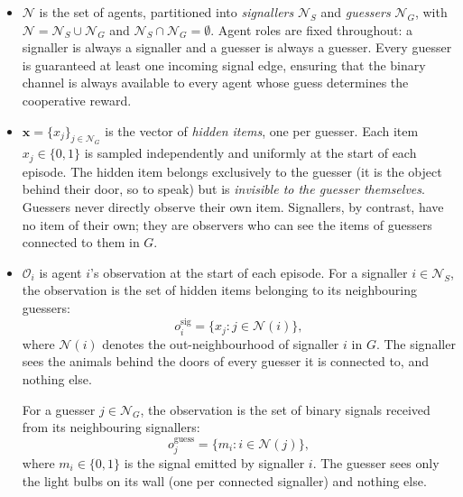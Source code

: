 \documentclass[a4paper,twoside,12pt]{report}
\begin{document}
    \begin{itemize}
        \item $\mathcal{N}$ is the set of agents, partitioned into
        \emph{signallers} $\mathcal{N}_S$ and \emph{guessers}
        $\mathcal{N}_G$, with $\mathcal{N} = \mathcal{N}_S \cup \mathcal{N}_G$
        and $\mathcal{N}_S \cap \mathcal{N}_G = \emptyset$. Agent roles are
        fixed throughout: a signaller is always a signaller and a guesser is
        always a guesser. Every guesser is guaranteed at least one incoming
        signal edge, ensuring that the binary channel is always available to
        every agent whose guess determines the cooperative reward.
    
        \item $\mathbf{x} = \{x_j\}_{j \in \mathcal{N}_G}$ is the vector of
        \emph{hidden items}, one per guesser. Each item $x_j \in \{0, 1\}$ is
        sampled independently and uniformly at the start of each episode. The
        hidden item belongs exclusively to the guesser (it is the object
        behind their door, so to speak) but is \emph{invisible to the
        guesser themselves}. Guessers never directly observe their own item.
        Signallers, by contrast, have no item of their own; they are observers
        who can see the items of guessers connected to them in $G$.
    
        \item $\mathcal{O}_i$ is agent $i$'s observation at the start of each
        episode. For a signaller $i \in \mathcal{N}_S$, the observation is the
        set of hidden items belonging to its neighbouring guessers:
        \begin{equation}
            o_i^{\mathrm{sig}} = \bigl\{ x_j : j \in \mathcal{N}(i) \bigr\},
        \end{equation}
        where $\mathcal{N}(i)$ denotes the out-neighbourhood of signaller $i$
        in $G$. The signaller sees the animals behind the doors of every guesser
        it is connected to, and nothing else.
    
        For a guesser $j \in \mathcal{N}_G$, the observation is the set of
        binary signals received from its neighbouring signallers:
        \begin{equation}
            o_j^{\mathrm{guess}} = \bigl\{ m_i : i \in \mathcal{N}(j) \bigr\},
        \end{equation}
        where $m_i \in \{0, 1\}$ is the signal emitted by signaller $i$.
        The guesser sees only the light bulbs on its wall (one per connected
        signaller) and nothing else. 
    

\end{itemize}
\end{document}
